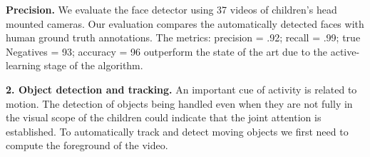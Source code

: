 \documentclass[10pt,letterpaper]{article}
\begin{document}
{\bf Precision.} We evaluate the face detector using 37 videos of children's head mounted cameras.  Our evaluation compares the automatically detected faces with human ground truth annotations. The metrics:  precision = .92; recall = .99; true Negatives = 93; accuracy = 96 outperform the state of the art \cite{dpmface} due to the active-learning stage of the algorithm. 

{\bf 2. Object detection and tracking.} An important cue of activity is related to motion. The detection of objects being handled even when they are not fully in the visual scope of the children could indicate that the joint attention is established. To automatically track and detect moving objects we first need to compute the foreground of the video. 

\end{document}
